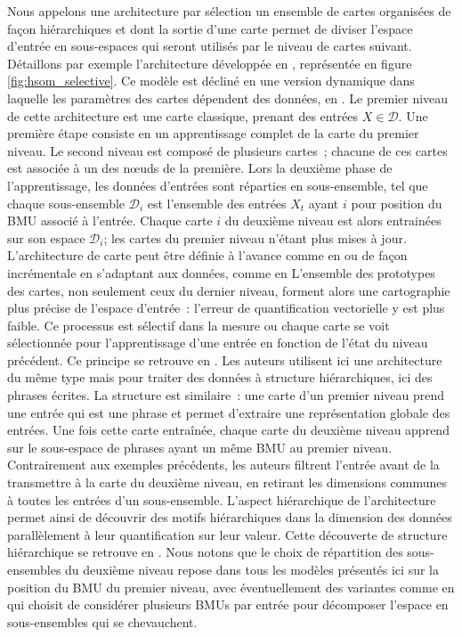 \documentclass[../main]{subfiles}
\begin{document}
Nous appelons une architecture par sélection un ensemble de cartes organisées de façon hiérarchiques et dont la sortie d'une carte permet de diviser l'espace d'entrée en sous-espaces qui seront utilisés par le niveau de cartes suivant.
Détaillons par exemple l'architecture développée en \cite{barbalho_hierarchical_2001}, représentée en figure \ref{fig:hsom_selective}. Ce modèle est décliné en une version dynamique dans laquelle les paramètres des cartes dépendent des données, en \cite{Costa2016ANS}.
Le premier niveau de cette architecture est une carte classique, prenant des entrées $X \in \mathcal{D}$.
Une première étape consiste en un apprentissage complet de la carte du premier niveau.
Le second niveau est composé de plusieurs cartes~; chacune de ces cartes est associée à un des n\oe{}uds de la première.
Lors la deuxième phase de l'apprentissage, les données d'entrées sont réparties en sous-ensemble, tel que chaque sous-ensemble $\mathcal{D}_i$ est l'ensemble des entrées $X_t$ ayant $i$ pour position du BMU associé à l'entrée.
Chaque carte $i$ du deuxième niveau est alors entrainées sur son espace $\mathcal{D}_i$; les cartes du premier niveau n'étant plus mises à jour.
L'architecture de carte peut être définie à l'avance comme en \cite{barbalho_hierarchical_2001} ou de façon incrémentale en s'adaptant aux données, comme en \cite{Costa2016ANS} 
L'ensemble des prototypes des cartes, non seulement ceux du dernier niveau, forment alors une cartographie plus précise de l'espace d'entrée~: l'erreur de quantification vectorielle y est plus faible.
Ce processus est sélectif dans la mesure ou chaque carte se voit sélectionnée pour l'apprentissage d'une entrée en fonction de l'état du niveau précédent.
Ce principe se retrouve en \cite{miikkulainen_script_1992}. 
Les auteurs utilisent ici une architecture du même type mais pour traiter des données à structure hiérarchiques, ici des phrases écrites. La structure est similaire~: une carte d'un premier niveau prend une entrée qui est une phrase et permet d'extraire une représentation globale des entrées. Une fois cette carte entraînée, chaque carte du deuxième niveau apprend sur le sous-espace de phrases ayant un même BMU au premier niveau. Contrairement aux exemples précédents, les auteurs filtrent l'entrée avant de la transmettre à la carte du deuxième niveau, en retirant les dimensions communes à toutes les entrées d'un sous-ensemble. L'aspect hiérarchique de l'architecture permet ainsi de découvrir des motifs hiérarchiques dans la dimension des données parallèlement à leur quantification sur leur valeur.
Cette découverte de structure hiérarchique se retrouve en \cite{ordonez_hierarchical_2010,dittenbach_growing_2000}.
Nous notons que le choix de répartition des sous-ensembles du deuxième niveau repose dans tous les modèles présentés ici sur la position du BMU du premier niveau, avec éventuellement des variantes comme en \cite{suganthan_pattern_2001} qui choisit de considérer plusieurs BMUs par entrée pour décomposer l'espace en sous-ensembles qui se chevauchent.
\end{document}
